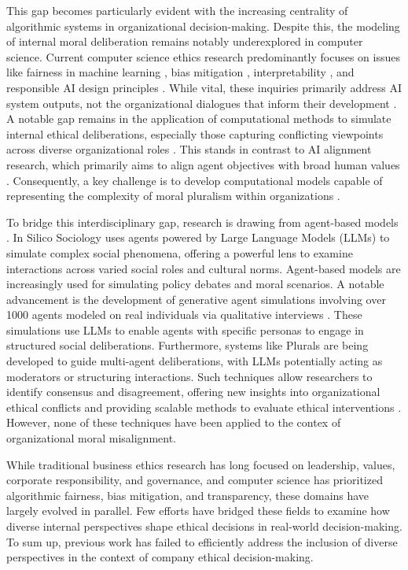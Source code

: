 This gap becomes particularly evident with the increasing centrality of algorithmic systems in organizational decision-making. Despite this, the modeling of internal moral deliberation remains notably underexplored in computer science. Current computer science ethics research predominantly focuses on issues like fairness in machine learning \cite{mehrabi2022survey}, bias mitigation \cite{bianchi2023easily}, interpretability \cite{doshi-velez2017towards}, and responsible AI design principles \cite{leslieunderstanding, sandersonimplementing,sekrstai,sadek2025challenges}. While vital, these inquiries primarily address AI system outputs, not the organizational dialogues that inform their development \cite{madaio_etal_2020}. A notable gap remains in the application of computational methods to simulate internal ethical deliberations, especially those capturing conflicting viewpoints across diverse organizational roles \cite{herdel2024exploregen}. This stands in contrast to AI alignment research, which primarily aims to align agent objectives with broad human values \cite{gabrielartificial}. Consequently, a key challenge is to develop computational models capable of representing the complexity of moral pluralism within organizations \cite{sekrstai}.

To bridge this interdisciplinary gap, research is drawing from agent-based models \cite{gilbert_2022}. In Silico Sociology \cite{kozlowski_etal_2024} uses agents powered by Large Language Models (LLMs) to simulate complex social phenomena, offering a powerful lens to examine interactions across varied social roles and cultural norms. Agent-based models are increasingly used for simulating policy debates and moral scenarios. A notable advancement is the development of generative agent simulations involving over 1000 agents modeled on real individuals via qualitative interviews \cite{park_etal_2024_1000}. These simulations use LLMs to enable agents with specific personas to engage in structured social deliberations. Furthermore, systems like Plurals \cite{ashkinaze_etal_2025} are being developed to guide multi-agent deliberations, with LLMs potentially acting as moderators or structuring interactions. Such techniques allow researchers to identify consensus and disagreement, offering new insights into organizational ethical conflicts and providing scalable methods to evaluate ethical interventions \cite{rao_etal_2025_riskrags}. However, none of these techniques have been applied to the contex of organizational moral misalignment.

While traditional business ethics research has long focused on leadership, values, corporate responsibility, and governance, and computer science has prioritized algorithmic fairness, bias mitigation, and transparency, these domains have largely evolved in parallel. Few efforts have bridged these fields to examine how diverse internal perspectives shape ethical decisions in real-world decision-making.
To sum up, previous work has failed to efficiently address the inclusion of diverse perspectives in the context of company ethical decision-making.

